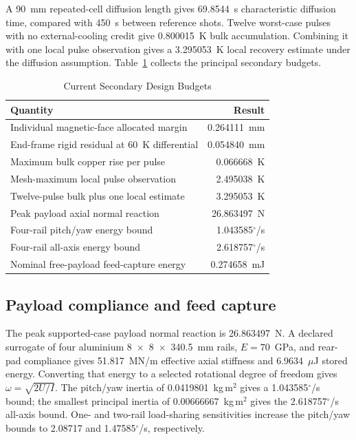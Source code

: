 \documentclass[conference,a4paper]{IEEEtran}
\begin{document}
A 90~mm repeated-cell diffusion length gives 69.8544~s characteristic diffusion time, compared with 450~s between reference shots. Twelve worst-case pulses with no external-cooling credit give 0.800015~K bulk accumulation. Combining it with one local pulse observation gives a 3.295053~K local recovery estimate under the diffusion assumption. Table~\ref{tab:budgets} collects the principal secondary budgets.

\begin{table}[t]
\caption{Current Secondary Design Budgets}
\label{tab:budgets}
\centering\small
\begin{tabular}{p{}r}
\toprule
Quantity&Result\\
\midrule
Individual magnetic-face allocated margin&0.264111~mm\\
End-frame rigid residual at 60~K differential&0.054840~mm\\
Maximum bulk copper rise per pulse&0.066668~K\\
Mesh-maximum local pulse observation&2.495038~K\\
Twelve-pulse bulk plus one local estimate&3.295053~K\\
Peak payload axial normal reaction&26.863497~N\\
Four-rail pitch/yaw energy bound&1.043585$^\circ$/s\\
Four-rail all-axis energy bound&2.618757$^\circ$/s\\
Nominal free-payload feed-capture energy&0.274658~mJ\\
\bottomrule
\end{tabular}
\end{table}

\subsection{Payload compliance and feed capture}
The peak supported-case payload normal reaction is 26.863497~N. A declared surrogate of four aluminium 8~$\times$~8~$\times$~340.5~mm rails, $E=70$~GPa, and rear-pad compliance gives 51.817~MN/m effective axial stiffness and 6.9634~$\mu$J stored energy. Converting that energy to a selected rotational degree of freedom gives $\omega=\sqrt{2U/I}$. The pitch/yaw inertia of 0.0419801~kg\,m$^2$ gives a 1.043585$^\circ$/s bound; the smallest principal inertia of 0.00666667~kg\,m$^2$ gives the 2.618757$^\circ$/s all-axis bound. One- and two-rail load-sharing sensitivities increase the pitch/yaw bounds to 2.08717 and 1.47585$^\circ$/s, respectively.
\end{document}
